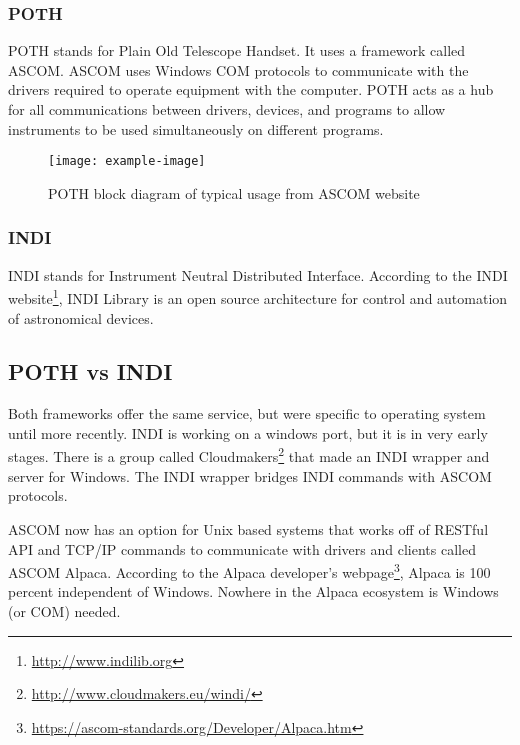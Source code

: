 \subsubsection{POTH}
POTH stands for Plain Old Telescope Handset. It uses a framework called ASCOM\@.
ASCOM uses Windows COM protocols to communicate with the drivers required to operate equipment with the computer.
POTH acts as a hub for all communications between drivers, devices, and programs to allow instruments to be used simultaneously 
on different programs.
\begin{figure}[h]
    \centering
    \texttt{[image: example-image]}%
    \caption{POTH block diagram of typical usage from ASCOM website~\protect\cite{ascom}}
\label{fig:poth}
\end{figure}

\subsubsection{INDI}
INDI stands for Instrument Neutral Distributed Interface.
According to the INDI website\footnote{\url{http://www.indilib.org}}, INDI Library is an open source architecture for control and automation of astronomical devices.

\subsection{POTH vs INDI}
Both frameworks offer the same service, but were specific to operating system until more recently.
INDI is working on a windows port, but it is in very early stages. 
There is a group called Cloudmakers\footnote{\url{http://www.cloudmakers.eu/windi/}} that made an INDI wrapper and server for Windows.
The INDI wrapper bridges INDI commands with ASCOM protocols.

ASCOM now has an option for Unix based systems that works off of RESTful API and TCP/IP
commands to communicate with drivers and clients called ASCOM Alpaca.
According to the Alpaca developer's webpage\footnote{\url{https://ascom-standards.org/Developer/Alpaca.htm}},
Alpaca is 100 percent independent of Windows. Nowhere in the Alpaca ecosystem is Windows (or COM) needed.
